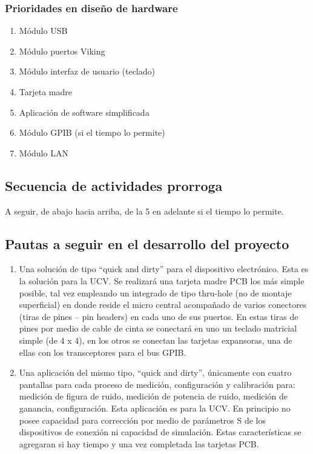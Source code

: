 \documentclass[paper=letter,oneside,fontsize=12pt, parskip=full]{article}
\begin{document}
	\subsubsection{Prioridades en diseño de hardware}
	
	\begin{enumerate}
		\item Módulo USB
		\item Módulo puertos Viking
		\item Módulo interfaz de usuario (teclado)
		\item Tarjeta madre
		\item Aplicación de software simplificada
		\item Módulo GPIB (si el tiempo lo permite)
		\item Módulo LAN
	\end{enumerate}

	\subsection{Secuencia de actividades prorroga}
	
	A seguir, de abajo hacia arriba, de la 5 en adelante si el tiempo lo permite.

	
	\subsection{Pautas a seguir en el desarrollo del proyecto}
	
	\begin{enumerate}
	
		\item Una solución de tipo “quick and dirty” para el dispositivo electrónico. Esta es la solución para la UCV. Se realizará una tarjeta madre PCB los más simple posible, tal vez empleando un integrado de tipo thru-hole (no de montaje superficial) en donde reside el micro central acompañado de varios conectores (tiras de pines – pin headers) en cada uno de sus puertos. En estas tiras de pines por medio de cable de cinta se conectará en uno un teclado matricial simple (de 4 x 4), en los otros se conectan las tarjetas expansoras, una de ellas con los transceptores para el bus GPIB.
		
		\item Una aplicación del mismo tipo, “quick and dirty”, únicamente con cuatro pantallas para cada proceso de medición, configuración y calibración para: medición de figura de ruido, medición de potencia de ruido, medición de ganancia, configuración. Esta aplicación es para la UCV. En principio no posee capacidad para corrección por medio de parámetros S de los dispositivos de conexión ni capacidad de simulación. Estas características se agregaran si hay tiempo y una vez completada las tarjetas PCB.	
	
	\end{enumerate}
	
\end{document}
